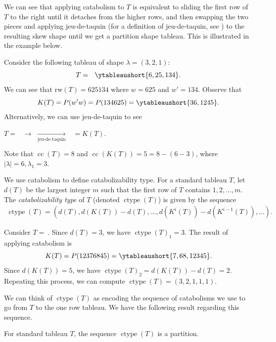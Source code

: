 \documentclass[ALCO, Unicode]{cedram}
\DeclareMathOperator{\ctype}{ctype}
\DeclareMathOperator{\cc}{cc}
\begin{document}
We can see that applying catabolism to $T$ is equivalent to sliding the first row of $T$ to the right until it detaches from the higher rows, and then swapping the two pieces and applying jeu-de-taquin (for a definition of jeu-de-taquin, see \cite[Chapter 7.A1.2]{EC2}) to the resulting skew shape until we get a partition shape tableau. This is illustrated in the example below.

\begin{ex}   Consider the following tableau of shape $\lambda = (3,2,1)$: \[T = \ \ \ytableaushort{6,25,134}.\]
We can see that $\text{rw}(T) = 625134$ where $w = 625$ and $w' = 134$.  Observe that \[K(T) = P(w'w) =  P(134625) =  \ytableaushort{36,1245}.\]
Alternatively, we can use jeu-de-taquin to see
\begin{center}
$T = \ \ $ $\rightarrow$   $\xrightarrow[\text{jeu-de-taquin}]{}$   $\ \  = K(T).$
\end{center}
Note that $\cc(T) = 8$ and $\cc(K(T)) = 5 = 8 - (6-3)$, where $|\lambda| = 6, \lambda_1 = 3$.
\end{ex}

We use catabolism to define catabolizability type. For a standard tableau $T$, let $d(T)$ be the largest integer $m$ such that the first row of $T$ contains $1,2,\dots, m$.
The \textit{catabolizability type} of $T$ (denoted $\ctype(T)$) is given by the sequence
\begin{align}
    \ctype(T) = (d(T), d(K(T))-d(T), \dots, d(K^{i}(T)) - d(K^{i-1}(T)),\dots).
\end{align}

\begin{ex}\label{ex:cat using direct def}
    Consider 
$T =\  $. Since $d(T) = 3$, we have $\ctype(T)_1 = 3$.
The result of applying catabolism is \[K(T) = P(12376845) = \ytableaushort{7,68,12345}.\]
Since $d(K(T)) = 5$, we have $\ctype(T)_2 = d(K(T)) - d(T) = 2$.
Repeating this process, we can compute $\ctype(T) = (3,2,1,1,1)$.
\end{ex}

We can think of $\ctype(T)$ as encoding the sequence of catabolisms we use to go from $T$ to the one row tableau. We have the following result regarding this sequence.
\begin{prop}
    For standard tableau $T$, the sequence $\ctype(T)$ is a partition.
\end{prop}
\end{document}
